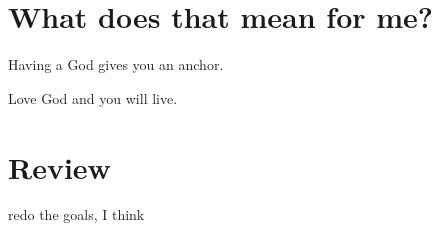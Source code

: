 \section{What does that mean for me?}

\begin{frame}
	\begin{description}[Luke 10:25-27]
	\item[Luke 4:1-13] Having a God gives you an anchor. 
	\item[Luke 10:25-27] Love God and you will live.
	\end{description}
\end{frame}

\section*{Review}
\begin{frame}
redo the goals, I think 
\end{frame}